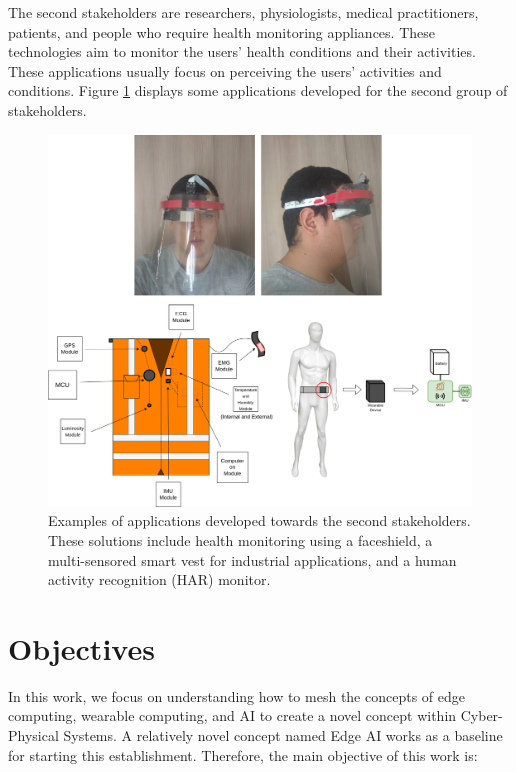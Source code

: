 The second stakeholders are researchers, physiologists, medical practitioners, patients, and people who require health monitoring appliances. These technologies aim to monitor the users' health conditions and their activities. These applications usually focus on perceiving the users' activities and conditions. Figure \ref{fig:stakeholder-health} displays some applications developed for the second group of stakeholders.

\begin{figure}[h!]
    \centering
    \includegraphics[width = \linewidth]{Figures/stakeholder-health.png}
    \caption{Examples of applications developed towards the second stakeholders. These solutions include health monitoring using a faceshield, a multi-sensored smart vest for industrial applications, and a human activity recognition (HAR) monitor.}
    \label{fig:stakeholder-health}
\end{figure}

\section{Objectives}

In this work, we focus on understanding how to mesh the concepts of edge computing, wearable computing, and AI to create a novel concept within Cyber-Physical Systems. A relatively novel concept named Edge AI works as a baseline for starting this establishment. Therefore, the main objective of this work is:

